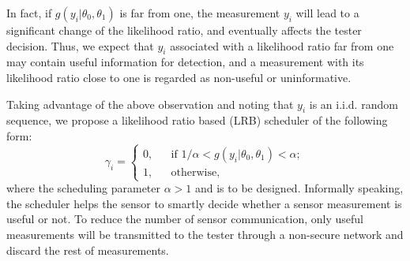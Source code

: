 \documentclass[journal]{IEEEtran}
\begin{document}
In fact, if $g(y_i|\theta_{0},\theta_{1})$ is far from one, the measurement $y_i$ will lead to a significant change of the likelihood ratio, and eventually affects the tester decision. Thus, we expect that $y_{i}$ associated with a likelihood ratio far from one may contain useful information for detection, and a measurement with its likelihood ratio close to one is regarded as non-useful or uninformative.

Taking advantage of the above observation and noting that $y_i$ is an i.i.d. random sequence, we propose a likelihood ratio based (LRB) scheduler of the following form:
\begin{equation}
\gamma_{i}=\left\{
\begin{array}{rcl}
0,       &      &\text{if  } { {1}/{\alpha}<g(y_{i} | \theta_{0},\theta_{1})<\alpha};\\
1,     &      & \text{otherwise,}
\end{array} \right.  \label{LRB scheduler}
\end{equation}
where the scheduling parameter $\alpha>1$ and is to be designed. Informally speaking, the scheduler helps the sensor to smartly decide whether a sensor measurement is useful or not.  To reduce the number of sensor communication, only useful measurements will be transmitted to the tester through a non-secure network and discard the rest of measurements.
\end{document}

